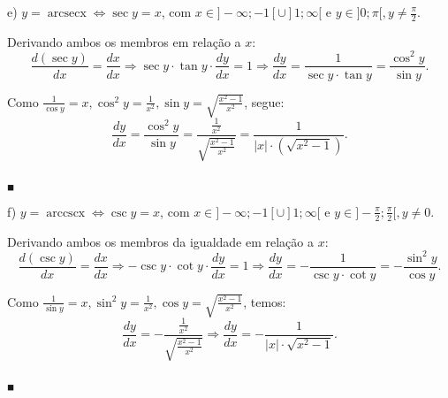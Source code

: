 \documentclass{article}
\begin{document}
{\begin{newpage}
e) $y= \operatorname{arcsec{x}} \Leftrightarrow \sec{y} = x$, com $x\in ]-\infty;-1[ \cup ]1;\infty[$ e $\displaystyle{y\in ]0;\pi [, y\neq\frac{\pi }{2}}$.
\par Derivando ambos os membros em relação a $x$:
\begin{equation*} \displaystyle{\frac{d(\sec{y})}{dx} = \frac{dx}{dx} \Rightarrow \sec{y}\cdot\tan{y}\cdot\frac{dy}{dx} = 1 \Rightarrow \frac{dy}{dx} = \frac{1}{\sec{y}\cdot\tan{y}} = \frac{\cos^{2}{y}}{\sin{y}}}.\end{equation*}
\par Como $\displaystyle{\frac{1}{\cos{y}} = x, \cos^{2}{y} = \frac{1}{x^2}, \sin{y} = \sqrt{\frac{x^2 - 1}{x^2}}}$, segue:
\begin{equation*} \displaystyle{\frac{dy}{dx} = \frac{\cos^{2}{y}}{\sin{y}} = \frac{\frac{1}{x^2}}{\sqrt{\frac{x^2 - 1}{x^2}}} = \frac{1}{|x|\cdot (\sqrt{x^2 - 1})}}.\end{equation*}\begin{flushright} $_{\blacksquare }$ \end{flushright}
\par
\vspace{0.3cm}
f) $y=\operatorname{arccsc{x}} \Leftrightarrow \csc{y} = x$, com $x\in ]-\infty;-1[ \cup ]1;\infty[$ e $\displaystyle{y\in \Big]-\frac{\pi }{2};\frac{\pi }{2}\Big[, y\neq 0}$.
\par Derivando ambos os membros da igualdade em relação a $x$:
\begin{equation*} \displaystyle{\frac{d(\csc{y})}{dx} = \frac{dx}{dx} \Rightarrow -\csc{y}\cdot\cot{y}\cdot\frac{dy}{dx} = 1 \Rightarrow \frac{dy}{dx} = -\frac{1}{\csc{y}\cdot\cot{y}} = -\frac{\sin^{2}{y}}{\cos{y}}}.\end{equation*}
\par Como $\displaystyle{\frac{1}{\sin{y}} = x, \sin^{2}{y} = \frac{1}{x^2}, \cos{y} = \sqrt{\frac{x^2 - 1}{x^2}}}$, temos:
\begin{equation*} \displaystyle{\frac{dy}{dx} = -\frac{\frac{1}{x^2}}{\sqrt{\frac{x^2 - 1}{x^2}}} \Rightarrow \frac{dy}{dx} = -\frac{1}{|x|\cdot\sqrt{x^2 - 1}}}.\end{equation*}\begin{flushright} $_{\blacksquare }$ \end{flushright}
\par
\vspace{0.3cm}

\end{newpage}}
\end{document}
